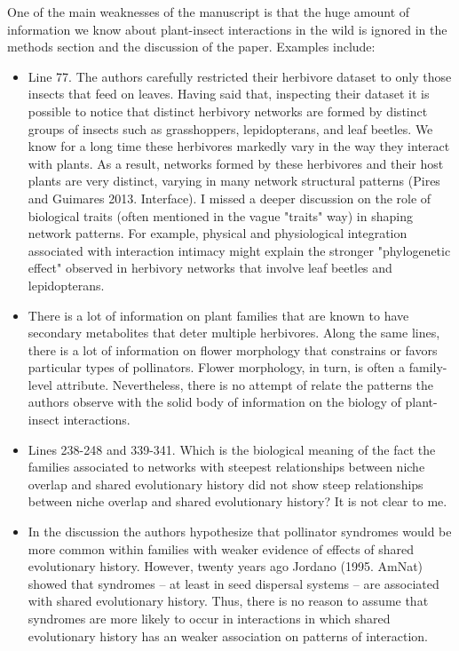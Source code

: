 \documentclass[12pt]{letter}
\newenvironment{refquote}{\bigskip \begin{it}}{\end{it}\smallskip}
\begin{document}
    \begin{refquote}

      One of the main weaknesses of the manuscript is that the huge amount of information we know about plant-insect interactions in the wild is ignored in the methods section and the discussion of the paper. Examples include:

      \begin{itemize}

      \item Line 77. The authors carefully restricted their herbivore dataset to only those insects that feed on leaves. Having said that, inspecting their dataset it is possible to notice that distinct herbivory networks are formed by distinct groups of insects such as grasshoppers, lepidopterans, and leaf beetles. We know for a long time these herbivores markedly vary in the way they interact with plants. As a result, networks formed by these herbivores and their host plants are very distinct, varying in many network structural patterns (Pires and Guimares 2013. Interface). I missed a deeper discussion on the role of biological traits (often mentioned in the vague "traits" way) in shaping network patterns. For example, physical and physiological integration associated with interaction intimacy might explain the stronger "phylogenetic effect" observed in herbivory networks that involve leaf beetles and lepidopterans.


      \item There is a lot of information on plant families that are known to have secondary metabolites that deter multiple herbivores. Along the same lines, there is a lot of information on flower morphology that constrains or favors particular types of pollinators. Flower morphology, in turn, is often a family-level attribute. Nevertheless, there is no attempt of relate the patterns the authors observe with the solid body of information on the biology of plant-insect interactions.


      \item Lines 238-248 and 339-341. Which is the biological meaning of the fact the families associated to networks with steepest relationships between niche overlap and shared evolutionary history did not show steep relationships between niche overlap and shared evolutionary history? It is not clear to me.


      \item In the discussion the authors hypothesize that pollinator syndromes would be more common within families with weaker evidence of effects of shared evolutionary history. However, twenty years ago Jordano (1995. AmNat) showed that syndromes – at least in seed dispersal systems – are associated with shared evolutionary history. Thus, there is no reason to assume that syndromes are more likely to occur in interactions in which shared evolutionary history has an weaker association on patterns of interaction.

    \end{itemize}
    \end{refquote}
\end{document}
